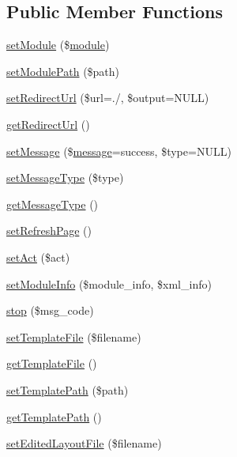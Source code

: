 \subsection*{Public Member Functions}
\begin{DoxyCompactItemize}
\item 
\hyperlink{classModuleObject_a610f40078a4c8590452eaedf794350ed}{set\+Module} (\$\hyperlink{classmodule}{module})
\item 
\hyperlink{classModuleObject_a277cebf9e472c1af7c00eab68414a567}{set\+Module\+Path} (\$path)
\item 
\hyperlink{classModuleObject_a6e3aac0a3457fe14845216d15dba98ec}{set\+Redirect\+Url} (\$url=\textquotesingle{}./\textquotesingle{}, \$output=N\+U\+LL)
\item 
\hyperlink{classModuleObject_ae7c0b4d36f7ef9e8b3ec59a6a9bf6116}{get\+Redirect\+Url} ()
\item 
\hyperlink{classModuleObject_a8142e8e24082c30a38f57239ddc899cf}{set\+Message} (\$\hyperlink{classmessage}{message}=\textquotesingle{}success\textquotesingle{}, \$type=N\+U\+LL)
\item 
\hyperlink{classModuleObject_a9f65f760815bb7c6667a2e521578af10}{set\+Message\+Type} (\$type)
\item 
\hyperlink{classModuleObject_aa0c2daa9dda892df56eb5fe7c754e25b}{get\+Message\+Type} ()
\item 
\hyperlink{classModuleObject_a6d0d3436c8c64591e1a3534647714969}{set\+Refresh\+Page} ()
\item 
\hyperlink{classModuleObject_a35d0b9120ea393d4b4177b0c667e198c}{set\+Act} (\$act)
\item 
\hyperlink{classModuleObject_afbcee54b026b35a2a4b4a454724bb9be}{set\+Module\+Info} (\$module\+\_\+info, \$xml\+\_\+info)
\item 
\hyperlink{classModuleObject_ac4c2bac7917c3ab3a0e816b99574727c}{stop} (\$msg\+\_\+code)
\item 
\hyperlink{classModuleObject_aa38e116023d54d3f5d8f507bb87663f4}{set\+Template\+File} (\$filename)
\item 
\hyperlink{classModuleObject_af5456f80bf7bd5d3c20dd6547423a419}{get\+Template\+File} ()
\item 
\hyperlink{classModuleObject_a440407bd8b6b16eb03115ad4a5c5835a}{set\+Template\+Path} (\$path)
\item 
\hyperlink{classModuleObject_a10f29d4a49d7e24bdab4e348633c6609}{get\+Template\+Path} ()
\item 
\hyperlink{classModuleObject_a28e95b299aeac82b450e6ed8b121ff05}{set\+Edited\+Layout\+File} (\$filename)

\end{DoxyCompactItemize}
